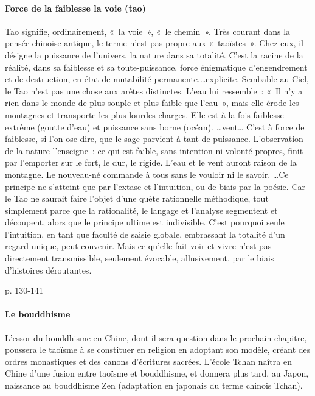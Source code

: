 \paragraph{Force de la faiblesse la voie (tao)} Tao signifie, ordinairement, « la voie », « le chemin ». Très courant dans la pensée chinoise antique, le terme n’est pas propre aux « taoïstes ». Chez eux, il désigne la puissance de l’univers, la nature dans sa totalité. C’est la racine de la réalité, dans sa faiblesse et sa toute-puissance, force énigmatique d’engendrement et de destruction, en état de mutabilité permanente.\ldots explicite. Sembable au Ciel, le Tao n’est pas une chose aux arêtes distinctes. L’eau lui ressemble : « Il n’y a rien dans le monde de plus souple et plus faible que l’eau », mais elle érode les montagnes et transporte les plus lourdes charges. Elle est à la fois faiblesse extrême (goutte d’eau) et puissance sans borne (océan). \ldots vent… C’est à force de faiblesse, si l’on ose dire, que le sage parvient à tant de puissance. L’observation de la nature l’enseigne : ce qui est faible, sans intention ni volonté propres, finit par l’emporter sur le fort, le dur, le rigide. L’eau et le vent auront raison de la montagne. Le nouveau-né commande à tous sans le vouloir ni le savoir. \ldots Ce principe ne s’atteint que par l’extase et l’intuition, ou de biais par la poésie. Car le Tao ne saurait faire l’objet d’une quête rationnelle méthodique, tout simplement parce que la rationalité, le langage et l’analyse segmentent et découpent, alors que le principe ultime est indivisible. C’est pourquoi seule l’intuition, en tant que faculté de saisie globale, embrassant la totalité d’un regard unique, peut convenir. Mais ce qu’elle fait voir et vivre n’est pas directement transmissible, seulement évocable, allusivement, par le biais d’histoires déroutantes.

\cite{PolDroit:voyage} p. 130-141 




\paragraph{Le bouddhisme} L’essor du bouddhisme en Chine, dont il sera question dans le prochain chapitre, poussera le taoïsme à se constituer en religion en adoptant son modèle, créant des ordres monastiques et des canons d’écritures sacrées. L’école Tchan naîtra en Chine d’une fusion entre taoïsme et bouddhisme, et donnera plus tard, au Japon, naissance au bouddhisme Zen (adaptation en japonais du terme chinois Tchan).

